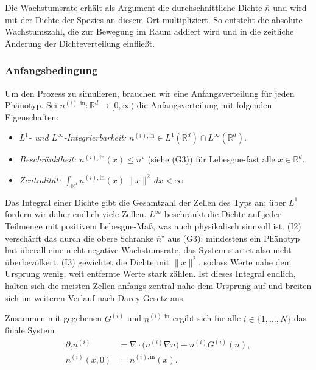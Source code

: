 \documentclass[11pt]{article}
\newcommand{\nin}{n^{(i),\mathrm{in}}}
\newcommand{\nbar}{\overline{n}}
\begin{document}
Die Wachstumsrate erhält als Argument die durchschnittliche Dichte $\nbar$ und
wird mit der Dichte der Spezies an diesem Ort multipliziert. So entsteht die
absolute Wachstumszahl, die zur Bewegung im Raum addiert wird und in die zeitliche
Änderung der Dichteverteilung einfließt.

\subsubsection{Anfangsbedingung}
\label{sec:anfang}
Um den Prozess zu simulieren, brauchen wir eine Anfangsverteilung für jeden
Phänotyp. Sei $\nin \colon \mathbb{R}^d \to [0, \infty)$ die Anfangsverteilung mit
folgenden Eigenschaften:
\begin{itemize}
    \item[(I1)] \emph{$L^1$- und $L^\infty$-Integrierbarkeit:} $\nin \in
    L^1(\mathbb{R}^d) \cap L^\infty(\mathbb{R}^d)$.
    \item[(I2)] \emph{Beschränktheit:} $\nin(x) \le \nbar^{\star}$ (siehe (G3))
    für Lebesgue-fast alle $x \in \mathbb{R}^d$.
    \item[(I3)] \emph{Zentralität:} $\int_{\mathbb{R}^d} \nin(x)\, \lVert x
    \rVert^2 \, dx < \infty$.
\end{itemize}
Das Integral einer Dichte gibt die Gesamtzahl der Zellen des Typs an; über $L^1$
fordern wir daher endlich viele Zellen. $L^\infty$ beschränkt die Dichte auf jeder
Teilmenge mit positivem Lebesgue-Maß, was auch physikalisch sinnvoll ist. (I2)
verschärft das durch die obere Schranke $\nbar^{\star}$ aus (G3): mindestens ein
Phänotyp hat überall eine nicht-negative Wachstumsrate, das System startet also
nicht überbevölkert. (I3) gewichtet die Dichte mit $\lVert x \rVert^2$, sodass
Werte nahe dem Ursprung wenig, weit entfernte Werte stark zählen. Ist dieses
Integral endlich, halten sich die meisten Zellen anfangs zentral nahe dem Ursprung
auf und breiten sich im weiteren Verlauf nach Darcy-Gesetz aus.

Zusammen mit gegebenen $G^{(i)}$ und $\nin$ ergibt sich für alle $i \in \{1,
\dots, N\}$ das finale System
\begin{equation}
    \begin{aligned}
        \partial_t n^{(i)} &= \nabla \cdot \bigl( n^{(i)} \nabla \nbar \bigr)
        + n^{(i)} G^{(i)}(\nbar), \\
        n^{(i)}(x, 0) &= \nin(x).
    \end{aligned}
\end{equation}
\end{document}
